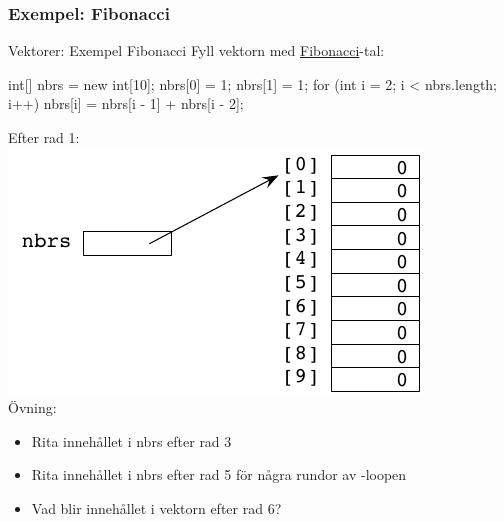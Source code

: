 \documentclass{lecturenotes}
\begin{document}
\subsubsection{Exempel: Fibonacci}
\begin{Slide}{Vektorer: Exempel Fibonacci}
Fyll vektorn med \href{https://sv.wikipedia.org/wiki/Leonardo_Fibonacci}{Fibonacci}-tal:
\begin{Code}[numberstyle=,numbers=left]
int[] nbrs = new int[10]; 
nbrs[0] = 1;
nbrs[1] = 1;
for (int i = 2; i < nbrs.length; i++) {
    nbrs[i] = nbrs[i - 1] + nbrs[i - 2];
}
\end{Code}
\begin{multicols*}{2}
Efter rad 1:  \\
\includegraphics[scale=0.6]{img/vektorbild1.pdf} \\
\columnbreak 
Övning:
\begin{itemize} \scriptsize
\item Rita innehållet i nbrs efter rad 3
\item Rita innehållet i nbrs efter rad 5 för några rundor av -loopen
\item Vad blir innehållet i vektorn efter rad 6? 
\end{itemize}  
\end{multicols*}
\end{Slide} 
\end{document}
